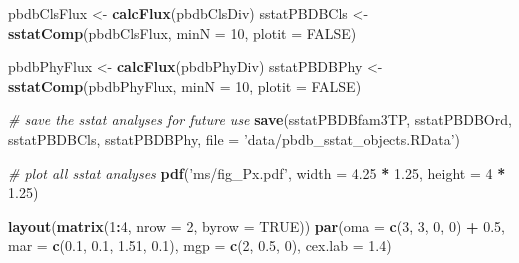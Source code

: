 \documentclass[]{article}
\newenvironment{Shaded}{\begin{snugshade}}{\end{snugshade}}
\newcommand{\KeywordTok}[1]{\textcolor[rgb]{0.13,0.29,0.53}{\textbf{#1}}}
\newcommand{\DataTypeTok}[1]{\textcolor[rgb]{0.13,0.29,0.53}{#1}}
\newcommand{\DecValTok}[1]{\textcolor[rgb]{0.00,0.00,0.81}{#1}}
\newcommand{\FloatTok}[1]{\textcolor[rgb]{0.00,0.00,0.81}{#1}}
\newcommand{\StringTok}[1]{\textcolor[rgb]{0.31,0.60,0.02}{#1}}
\newcommand{\CommentTok}[1]{\textcolor[rgb]{0.56,0.35,0.01}{\textit{#1}}}
\newcommand{\OtherTok}[1]{\textcolor[rgb]{0.56,0.35,0.01}{#1}}
\newcommand{\OperatorTok}[1]{\textcolor[rgb]{0.81,0.36,0.00}{\textbf{#1}}}
\newcommand{\NormalTok}[1]{#1}
\begin{document}
\begin{Shaded}
\begin{Highlighting}[]
{\NormalTok{pbdbClsFlux <-}\StringTok{ }\KeywordTok{calcFlux}\NormalTok{(pbdbClsDiv)}
\NormalTok{sstatPBDBCls <-}\StringTok{ }\KeywordTok{sstatComp}\NormalTok{(pbdbClsFlux, }\DataTypeTok{minN =} \DecValTok{10}\NormalTok{, }\DataTypeTok{plotit =} \OtherTok{FALSE}\NormalTok{)}

\NormalTok{pbdbPhyFlux <-}\StringTok{ }\KeywordTok{calcFlux}\NormalTok{(pbdbPhyDiv)}
\NormalTok{sstatPBDBPhy <-}\StringTok{ }\KeywordTok{sstatComp}\NormalTok{(pbdbPhyFlux, }\DataTypeTok{minN =} \DecValTok{10}\NormalTok{, }\DataTypeTok{plotit =} \OtherTok{FALSE}\NormalTok{)}

\CommentTok{# save the sstat analyses for future use}
\KeywordTok{save}\NormalTok{(sstatPBDBfam3TP, sstatPBDBOrd, sstatPBDBCls, sstatPBDBPhy, }
     \DataTypeTok{file =} \StringTok{'data/pbdb_sstat_objects.RData'}\NormalTok{)}


\CommentTok{# plot all sstat analyses}
\KeywordTok{pdf}\NormalTok{(}\StringTok{'ms/fig_Px.pdf'}\NormalTok{, }\DataTypeTok{width =} \FloatTok{4.25} \OperatorTok{*}\StringTok{ }\FloatTok{1.25}\NormalTok{, }\DataTypeTok{height =} \DecValTok{4} \OperatorTok{*}\StringTok{ }\FloatTok{1.25}\NormalTok{)}

\KeywordTok{layout}\NormalTok{(}\KeywordTok{matrix}\NormalTok{(}\DecValTok{1}\OperatorTok{:}\DecValTok{4}\NormalTok{, }\DataTypeTok{nrow =} \DecValTok{2}\NormalTok{, }\DataTypeTok{byrow =} \OtherTok{TRUE}\NormalTok{))}
\KeywordTok{par}\NormalTok{(}\DataTypeTok{oma =} \KeywordTok{c}\NormalTok{(}\DecValTok{3}\NormalTok{, }\DecValTok{3}\NormalTok{, }\DecValTok{0}\NormalTok{, }\DecValTok{0}\NormalTok{) }\OperatorTok{+}\StringTok{ }\FloatTok{0.5}\NormalTok{, }\DataTypeTok{mar =} \KeywordTok{c}\NormalTok{(}\FloatTok{0.1}\NormalTok{, }\FloatTok{0.1}\NormalTok{, }\FloatTok{1.51}\NormalTok{, }\FloatTok{0.1}\NormalTok{), }
    \DataTypeTok{mgp =} \KeywordTok{c}\NormalTok{(}\DecValTok{2}\NormalTok{, }\FloatTok{0.5}\NormalTok{, }\DecValTok{0}\NormalTok{), }\DataTypeTok{cex.lab =} \FloatTok{1.4}\NormalTok{)}

}
\end{Highlighting}
\end{Shaded}
\end{document}

